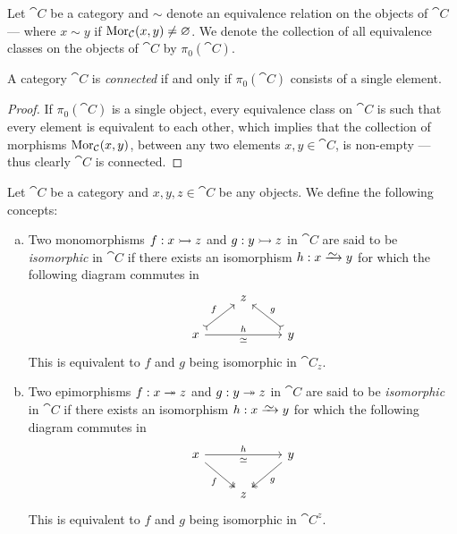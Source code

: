 \begin{definition}
\label{def:equivalence-class-category}
Let \(\cat C\) be a category and \(\sim\) denote an equivalence relation on the
objects of \(\cat C\) --- where \(x \sim y\) if \(\operatorname{Mor}_{\mathcal C}(x, y) \neq
\varnothing\). We denote the collection of all equivalence classes on the objects
of \(\cat C\) by \(\pi_0(\cat C)\).
\end{definition}

\begin{corollary}
\label{cor:connected-iff-class-point}
A category \(\cat C\) is \emph{connected} if and only if \(\pi_0(\cat C)\)
consists of a single element.
\end{corollary}

\begin{proof}
If \(\pi_0(\cat C)\) is a single object, every equivalence class on \(\cat C\)
is such that every element is equivalent to each other, which implies that the
collection of morphisms \(\operatorname{Mor}_{\mathcal C}(x, y)\), between any two elements \(x, y
\in \cat C\), is non-empty --- thus clearly \(\cat C\) is connected.
\end{proof}

\begin{definition}
\label{def:iso-mono-epi}
Let \(\cat C\) be a category and \(x, y, z \in \cat C\) be any objects. We
define the following concepts:
\begin{enumerate}[(a)]\setlength\itemsep{0em}
\item Two monomorphisms \(f: x \rightarrowtail z\) and \(g: y \rightarrowtail z\) in \(\cat C\) are
  said to be \emph{isomorphic} in \(\cat C\) if there exists an isomorphism \(h:
  x \isoto y\) for which the following diagram commutes in
  \[
    \begin{tikzcd}
      &z & \\
      x \ar[rr, "h", "\iso"'] \ar[ur, tail, "f"] &
      &y \ar[ul, tail, swap, "g"]
    \end{tikzcd}
  \]
  This is equivalent to \(f\) and \(g\) being isomorphic in \(\cat C_z\).
\item Two epimorphisms \(f: x \twoheadrightarrow z\) and \(g: y \twoheadrightarrow z\) in \(\cat C\) are
  said to be \emph{isomorphic} in \(\cat C\) if there exists an isomorphism \(h:
  x \isoto y\) for which the following diagram commutes in
  \[
    \begin{tikzcd}
      x \ar[rr, "h", "\iso"'] \ar[dr, two heads, swap, "f"] &
      &y \ar[dl, two heads, "g"] \\
      &z &
    \end{tikzcd}
  \]
  This is equivalent to \(f\) and \(g\) being isomorphic in \(\cat C^z\).
\end{enumerate}
\end{definition}

